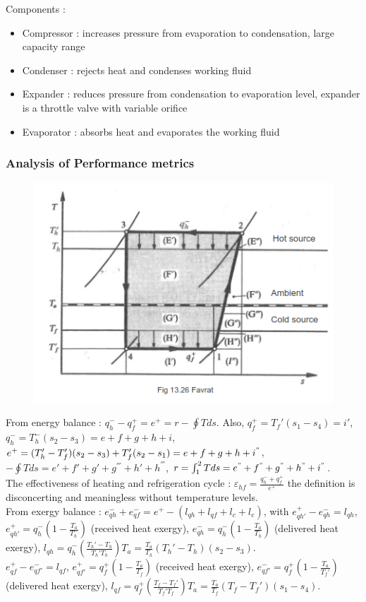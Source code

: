 \documentclass[../main.tex]{subfiles}
\begin{document}
Components : \begin{itemize}
    \item Compressor : increases pressure from evaporation to condensation, large capacity range
    \item Condenser : rejects heat and condenses working fluid
    \item Expander : reduces pressure from condensation to evaporation level, expander is a throttle valve with variable orifice
    \item Evaporator : absorbs heat and evaporates the working fluid
\end{itemize}

\subsubsection{Analysis of Performance metrics}

\begin{figure}[hbt!]
    \centering
    \includegraphics[width=0.5\linewidth]{IMAGES/HP/Screenshot from 2025-03-20 09-32-02.png}
\end{figure}

From energy balance : $q_h^- - q_f^+ = e^+ = r-\oint Tds$. Also, $q_f^+ = T_f'(s_1-s_4) = i'$, $q_h^- = T_h^-(s_2-s_3) = e+f+g+h+i$, $e^+ = (T_h'-T_f')(s_2-s_3)+T_f'(s_2-s_1) = e+f+g+h+i^"$, $-\oint Tds = e'+f'+g'+g^{'''}+h' + h^{'''}$, $r = \int_1^2 Tds = e^"+f^"+g^"+h^"+i^"$.\\
The effectiveness of heating and refrigeration cycle : $\varepsilon_{hf} = \frac{q_h^-+q_f^+}{e^+}$ the definition is disconcerting and meaningless without temperature levels. \\
From exergy balance : $e_{qh}^- + e_{qf}^- = e^+ - (l_{qh} + l_{qf} + l_c + l_e)$, with $e_{qh'}^+ - e_{qh}^- = l_{qh}$, $e_{qh'}^+ = q_h^- (1-\frac{T_a}{T_h^-})$ (received heat exergy), $e_{qh}^- = q_h^- (1-\frac{T_a}{T_h})$ (delivered heat exergy), $l_{qh} = q_h^- (\frac{T_h'-T_h}{T_h'T_h})T_a = \frac{T_a}{T_h}(T_h'-T_h)(s_2-s_3)$. \\
$e_{qf}^+ - e_{qf'}^- = l_{qf}$, $e_{qf'}^+ = q_f^+ (1-\frac{T_a}{T_f})$ (received heat exergy), $e_{qf'}^- = q_f^+ (1-\frac{T_a}{T_f'})$ (delivered heat exergy), $l_{qf} = q_f^+ (\frac{T_f-T_f'}{T_f'T_f})T_a = \frac{T_a}{T_f}(T_f-T_f')(s_1-s_4)$. \\
\end{document}
